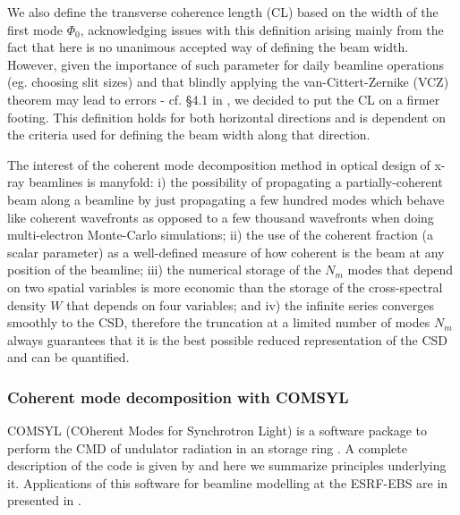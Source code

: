 \documentclass{iucr}              %
\newcommand{\todo}[1]{{\color{red}[TODO: "#1'']}}
\begin{document}
We also define the transverse coherence length (CL) based on the width of the first mode $\Phi_0$, acknowledging issues with this definition arising mainly from the fact that here is no unanimous accepted way of defining the beam width. However, given the importance of such parameter for daily beamline operations (eg. choosing slit sizes) and that blindly applying the van-Cittert-Zernike (VCZ) theorem may lead to errors - cf. §4.1 in \cite{geloni2008}, we decided to put the CL on a firmer footing. This definition holds for both horizontal directions and is dependent on the criteria used for defining the beam width along that direction. %

The interest of the coherent mode decomposition method in optical design of x-ray beamlines is manyfold: i) the possibility of propagating a partially-coherent beam along a beamline by just propagating a few hundred modes which behave like coherent wavefronts as opposed to a few thousand wavefronts when doing multi-electron Monte-Carlo simulations; ii) the use of the coherent fraction (a scalar parameter) as a well-defined measure of how coherent is the beam at any position of the beamline; iii) the numerical storage of the $N_m$ modes that depend on two spatial variables is more economic than the storage of the cross-spectral density $W$ that depends on four variables; and iv) the infinite series converges smoothly to the CSD, therefore the truncation at a limited number of modes $N_m$ always guarantees that it is the best possible reduced representation of the CSD and can be quantified.%

\subsubsection{Coherent mode decomposition with COMSYL\\}\label{sec:COMSYL} 
 COMSYL (COherent Modes for Synchrotron Light) is a software package to perform the CMD of undulator radiation in an storage ring \cite{codeCOMSYL}. A complete description of the code is given by  and here we summarize principles underlying it. Applications of this software for beamline modelling at the ESRF-EBS are in presented in \cite{glass2017, hierarchical}. 
\end{document}

